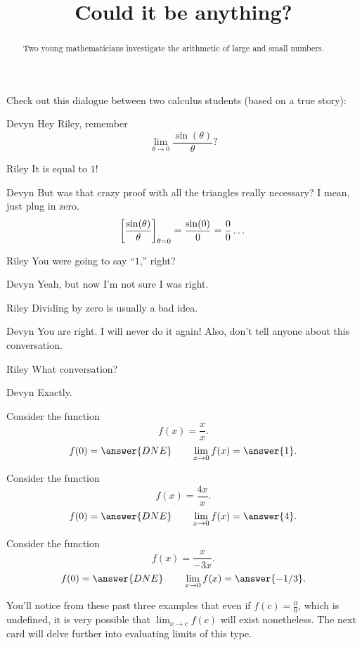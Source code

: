\documentclass{ximera}
\title[Break-Ground:]{Could it be anything?}
\begin{document}
\begin{abstract}
Two young mathematicians investigate the arithmetic of large
and small numbers.
\end{abstract}
\maketitle


Check out this dialogue between two calculus students (based on a true
story):


\begin{dialogue}
\item[Devyn] Hey Riley, remember
  \[
  \lim_{\theta\to 0}\frac{\sin(\theta)}{\theta}?
  \]
\item[Riley] It is equal to $1$!
\item[Devyn] But was that crazy proof with all the triangles really
  necessary? I mean, just plug in zero. 
  \[
  \bigg[ \frac{\sin(\theta)}{\theta} \bigg]_{\theta=0} = \frac{\sin(0)}{0}=\frac{0}{0}\dots
  \]
  \item[Riley] You were going to say ``$1$,'' right? 
  \item[Devyn] Yeah, but now I'm not sure I was right.
  \item[Riley] Dividing by zero is usually a bad idea.
  \item[Devyn] You are right. I will never do it again! Also, don't
    tell anyone about this conversation.
  \item[Riley] What conversation?
  \item[Devyn] Exactly.
\end{dialogue}



\begin{problem}
  Consider the function
  \[
  f(x) = \frac{x}{x}.
  \]
  \[
  f(0) = \answer{DNE}\qquad\lim_{x\to 0} f(x) = \answer{1}.
  \]
\end{problem}

\begin{problem}
  Consider the function
  \[
  f(x) = \frac{4x}{x}.
  \]
  \[
  f(0) = \answer{DNE}\qquad\lim_{x\to 0} f(x) = \answer{4}.
  \]
\end{problem}

\begin{problem}
  Consider the function
  \[
  f(x) = \frac{x}{-3x}.
  \]
  \[
  f(0) = \answer{DNE}\qquad\lim_{x\to 0} f(x) = \answer{-1/3}.
  \]
  
  \begin{feedback}[correct]
  You'll notice from these past three examples that even if $f(c) = \frac{0}{0}$, which is undefined, it is very possible that $\displaystyle\lim_{x \to c} f(c)$ will exist nonetheless.  The next card will delve further into evaluating limits of this type. 
  \end{feedback}
\end{problem}

%
\end{document}

